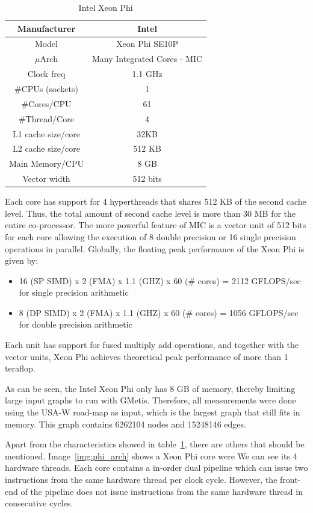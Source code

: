 \documentclass[abstract=on,9pt,twocolumn]{scrartcl}
\begin{document}
\begin{table}[H]
\centering
\footnotesize
\begin{tabular}{| c | c |}\hline
Manufacturer & Intel\\ \hline
Model & Xeon Phi SE10P\\ \hline
$\mu$Arch & Many Integrated Cores - MIC\\ \hline
Clock freq & 1.1 GHz\\ \hline
\#CPUs (sockets) & 1 \\ \hline
\#Cores/CPU & 61\\ \hline
\#Thread/Core & 4\\ \hline
L1 cache size/core & 32KB\\ \hline
L2 cache size/core & 512 KB\\ \hline
Main Memory/CPU & 8 GB\\ \hline
Vector width & 512 bits\\ \hline
\end{tabular}
\caption{Intel Xeon Phi}
\label{fig:mic}
\end{table}

Each core has support for 4 hyperthreads that shares 512 KB of the
second cache level. Thus, the total amount of second cache level is more
than 30 MB for the entire co-processor. The more powerful feature of MIC
is a vector unit of 512 bits for each core allowing the execution of 8
double precision or 16 single precision operations in parallel.
Globally, the floating peak performance of the Xeon Phi is given by:

\begin{itemize}
\item 16 (SP SIMD) x 2 (FMA) x 1.1 (GHZ) x 60 (\# cores) = 2112
  GFLOPS/sec for single precision arithmetic 
\item 8 (DP SIMD) x 2 (FMA) x 1.1 (GHZ) x 60 (\# cores) = 1056
  GFLOPS/sec for double precision arithmetic 
\end{itemize}

Each unit has support for fused multiply add operations, and together
with the vector units, Xeon Phi achieves theoretical peak performance of
more than 1 teraflop.

As can be seen, the Intel Xeon Phi only has 8 GB of memory, thereby
limiting large input graphs to run with GMetis. Therefore, all
measurements were done using the USA-W road-map as input, which is the
largest graph that still fits in memory. This graph contains 6262104
nodes and 15248146 edges.

Apart from the characteristics showed in table~\ref{fig:mic}, there are
others that should be mentioned. Image~\ref{img:phi_arch} shows a Xeon
Phi core were We can see its 4 hardware threads. Each core contains a
in-order dual pipeline which can issue two instructions from the same
hardware thread per clock cycle. However, the front-end of the pipeline
does not issue instructions from the same hardware thread in consecutive
cycles.\cite{Cepeda:PhiPerformance}
\end{document}
